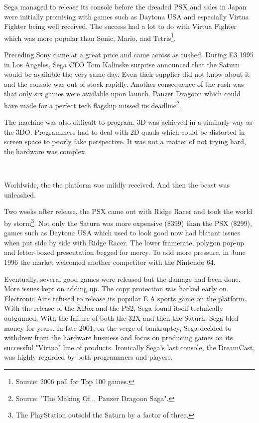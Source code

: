 \vspace{-10pt}
Sega managed to release its console before the dreaded PSX and sales in Japan were initially promising with games such as Daytona USA and especially Virtua Fighter being well received. The success had a lot to do with Virtua Fighter which was more popular than Sonic, Mario, and Tetris\footnote{Source: 2006 poll for Top 100 games.}.\\
\par
Preceding Sony came at a great price and came across as rushed. During E3 1995 in Los Angeles, Sega CEO Tom Kalinske surprise announced that the Saturn would be available the very same day. Even their supplier did not know about it and the console was out of stock rapidly. Another consequence of the rush was that only six games were available upon launch. Panzer Dragoon which could have made for a perfect tech flagship missed its deadline\footnote{Source: "The Making Of... Panzer Dragoon Saga".}.\\
\par The machine was also difficult to program. 3D was achieved in a similarly way as the 3DO. Programmers had to deal with 2D quads which could be distorted in screen space to poorly fake perspective. It was not a matter of not trying hard, the hardware was complex.\\
\par
{}\\
\par
Worldwide, the the platform was mildly received. And then the beast was unleashed.\\
\par
 Two weeks after release, the PSX came out with Ridge Racer and took the world by storm\footnote{The PlayStation outsold the Saturn by a factor of three.}. Not only the Saturn was more expensive (\$399) than the PSX (\$299), games such as Daytona USA which used to look good now had blatant issues when put side by side with Ridge Racer. The lower framerate, polygon pop-up and letter-boxed presentation begged for mercy. To add more pressure, in June 1996 the market welcomed another competitor with the Nintendo 64.\\
\par
Eventually, several good games were released but the damage had been done. More issues kept on adding up. The copy protection was hacked early on. Electronic Arts refused to release its popular E.A sports game on the platform. With the release of the XBox and the PS2, Sega found itself technically outgunned. With the failure of both the 32X and then the Saturn, Sega bled money for years. In late 2001, on the verge of bankruptcy, Sega decided to withdrew from the hardware business and focus on producing games on its successful "Virtua" line of products. Ironically Sega's last console, the DreamCast, was highly regarded by both programmers and players.


